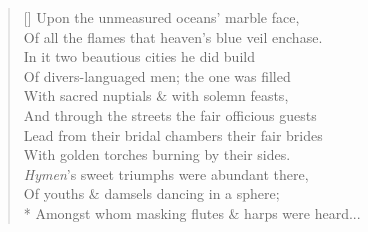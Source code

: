 \documentclass[MAIN]{subfiles}
\begin{document}
\begin{verse}[\versewidth]
Upon the unmeasured oceans' marble face,\\
Of all the flames that heaven's blue veil enchase.\\
In it two beautious cities he did build\\
Of divers-languaged men; the one was filled\\
With sacred nuptials \& with solemn feasts,\\
And through the streets the fair officious guests\\
Lead from their bridal chambers their fair brides\\
With golden torches burning by their sides.\\
\emph{Hymen}'s sweet triumphs were abundant there,\\
Of youths \& damsels dancing in a sphere;\\*
Amongst whom masking flutes \& harps were heard...
\end{verse}
\end{document}
